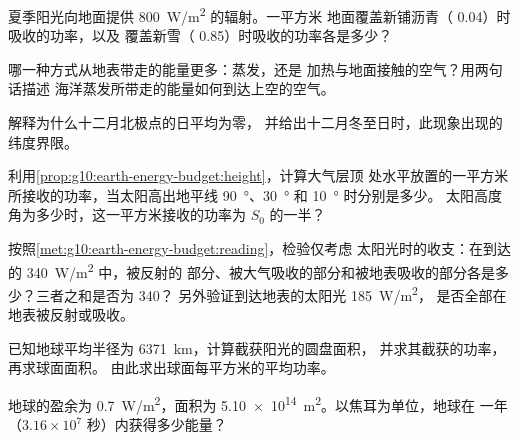 \begin{exercise}[$\star$]\label{exo:g10:earth-energy-budget:3}
夏季阳光向地面提供 \qty{800}{W/m^2} 的辐射。一平方米
地面覆盖新铺沥青（ 0.04）时吸收的功率，以及
覆盖新雪（ 0.85）时吸收的功率各是多少？
\end{exercise}

\begin{exercise}[$\star$]\label{exo:g10:earth-energy-budget:4}
哪一种方式从地表带走的能量更多：蒸发，还是
加热与地面接触的空气？用两句话描述
海洋蒸发所带走的能量如何到达上空的空气。
\end{exercise}

\begin{exercise}[$\star$]\label{exo:g10:earth-energy-budget:5}
解释为什么十二月北极点的日平均为零，
并给出十二月冬至日时，此现象出现的纬度界限。
\end{exercise}

\begin{exercise}[$\star\star$]\label{exo:g10:earth-energy-budget:6}
利用\cref{prop:g10:earth-energy-budget:height}，计算大气层顶
处水平放置的一平方米所接收的功率，当太阳高出地平线
\qty{90}{\degree}、\qty{30}{\degree} 和 \qty{10}{\degree} 时分别是多少。
太阳高度角为多少时，这一平方米接收的功率为 $S_0$ 的一半？
\end{exercise}

\begin{exercise}[$\star\star$]\label{exo:g10:earth-energy-budget:7}
按照\cref{met:g10:earth-energy-budget:reading}，检验仅考虑
太阳光时的收支：在到达的 \qty{340}{W/m^2} 中，被反射的
部分、被大气吸收的部分和被地表吸收的部分各是多少？三者之和是否为 340？
另外验证到达地表的太阳光 \qty{185}{W/m^2}，
是否全部在地表被反射或吸收。
\end{exercise}

\begin{exercise}[$\star\star$]\label{exo:g10:earth-energy-budget:8}
已知地球平均半径为 \qty{6371}{km}，计算截获阳光的圆盘面积，
并求其截获的功率，再求球面面积。
由此求出球面每平方米的平均功率。
\end{exercise}

\begin{exercise}[$\star\star$]\label{exo:g10:earth-energy-budget:9}
地球的盈余为 \qty{0.7}{W/m^2}，面积为
\qty{5.10e14}{m^2}。以焦耳为单位，地球在
一年（$3.16\times10^7$ 秒）内获得多少能量？
\end{exercise}

